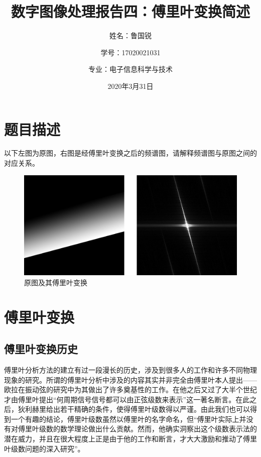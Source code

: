 \documentclass[UTF8]{ctexart}
\title{数字图像处理报告四：傅里叶变换简述}
\author{姓名：鲁国锐 \protect\newline
\and 学号：17020021031 \\
\and 专业：电子信息科学与技术}
\date{2020年3月31日}
\begin{document}
	\maketitle
	\renewcommand{\contentsname}{目录}
	\renewcommand{\listfigurename}{插图目录}
	\renewcommand{\listtablename}{表格目录}
	\renewcommand{\refname}{参考文献}
	\renewcommand{\abstractname}{摘要}
	\renewcommand{\indexname}{索引}
	\renewcommand{\tablename}{表}
	\renewcommand{\figurename}{图}
	
	
	
	\tableofcontents
	\newpage
	
	\hypersetup{
	bookmarks=true,
	colorlinks=true,
	linkcolor=red,
	urlcolor=blue
	}
	\section{题目描述}
	\indent 以下左图为原图，右图是经傅里叶变换之后的频谱图，请解释频谱图与原图之间的对应关系。

			
			\begin{figure}[H]
				\centering 
				\includegraphics[scale=0.4]{org_img.png} 
				\caption{原图及其傅里叶变换} 
				\label{problem_img}
			\end{figure}
		


	
	\section{傅里叶变换}\label{Fourier_transform}
		\subsection{傅里叶变换历史}\label{傅里叶变换简述}
        \nocite{digit_image_Gonzalez}
        \nocite{signal_and_system}
        \nocite{discrete-time_signal_processing}
			\indent 傅里叶分析方法的建立有过一段漫长的历史，涉及到很多人的工作和许多不同物理现象的研究\cite{signal_and_system}。所谓的傅里叶分析中涉及的内容其实并非完全由傅里叶本人提出——欧拉在振动弦的研究中为其做出了许多奠基性的工作。在他之后又过了大半个世纪才由傅里叶提出“何周期信号信号都可以由正弦级数来表示”这一著名断言。在此之后，狄利赫里给出若干精确的条件，使得傅里叶级数得以严谨。由此我们也可以得到一个有趣的结论，傅里叶级数虽然以傅里叶的名字命名，但“傅里叶实际上并没有对傅里叶级数的数学理论做出什么贡献。然而，他确实洞察出这个级数表示法的潜在威力，并且在很大程度上正是由于他的工作和断言，才大大激励和推动了傅里叶级数问题的深入研究”\cite{signal_and_system}。
            
\end{document}
